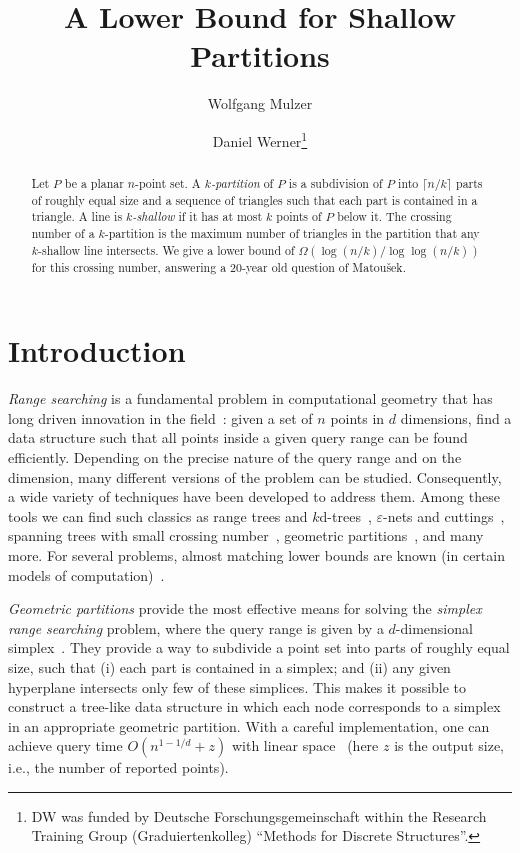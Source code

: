 \documentclass{paper}
\title{A Lower Bound for Shallow Partitions}
\author{Wolfgang Mulzer
         \and
        Daniel Werner\thanks{DW was funded by 
	 Deutsche Forschungsgemeinschaft within the Research Training
         Group (Graduiertenkolleg) ``Methods for Discrete Structures''.}
	}
\newcommand\eps{{\varepsilon}}
\newcommand\matousek{{Matou{\v{s}}ek}}
\begin{document}
\maketitle

\begin{abstract}
Let $P$ be a planar $n$-point set. A \emph{$k$-partition} of
$P$ is a subdivision of $P$ into $\lceil n/k\rceil$ parts of
roughly equal size and a sequence of triangles such that
each part is contained in a triangle. A line is \emph{$k$-shallow} 
if it has at most $k$ points of $P$ below it.
The crossing number of a $k$-partition is the maximum number
of triangles in the partition that any $k$-shallow line intersects.
We give a lower bound of $\Omega(\log (n/k)/\log\log(n/k))$ 
for this crossing number, answering a 20-year old question
of \matousek.
\end{abstract}

\section{Introduction}

\emph{Range searching} is a fundamental problem in computational 
geometry that has long driven innovation in the field~\cite{AgarwalEr99}:
given a set of $n$ points in $d$ dimensions, find a data
structure such that all points inside a given query range
can be found efficiently. Depending on the precise
nature of the query range and on the dimension,
many different versions of the problem can be studied. Consequently, 
a wide variety of techniques have been developed to address them. Among these
tools we can find such classics as range trees and
$k$d-trees~\cite[Chapter~5]{deBergChvKrOv08}, 
$\eps$-nets and cuttings~\cite{Chazelle00}, spanning trees with small 
crossing number~\cite{Welzl92}, 
geometric partitions~\cite{Matousek92b}, and many more. For several problems,
almost matching lower bounds are known (in certain models of 
computation)~\cite{Chazelle00}.

\emph{Geometric partitions} provide the most effective means for solving the
\emph{simplex range searching} problem, where the query range is
given by a $d$-dimensional simplex~\cite{Chan10,Matousek92b}.
They provide a way to subdivide a point set into 
parts of roughly equal size, such that (i) each part is contained in a simplex;
and (ii) any given hyperplane intersects only few of these simplices. 
This makes it possible to construct a tree-like data structure 
in which each node corresponds to a simplex in an appropriate geometric partition.
With a careful implementation, one can achieve query time
$O(n^{1-1/d} + z)$ with linear space~\cite{Chan10} (here $z$ is
the output size, i.e., the number of reported points).
\end{document}
